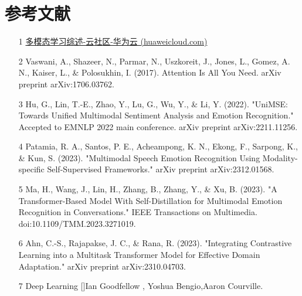 \documentclass[11pt]{article}
\begin{document}
    \section{参考文献}
    \begin{enumerate}
        \item [1]\href{https://bbs.huaweicloud.com/blogs/264134?utm_source=zhihu&utm_medium=bbs-ex&utm_campaign=ei&utm_content=content}{多模态学习综述-云社区-华为云 (huaweicloud.com)}
        \item [2]Vaswani, A., Shazeer, N., Parmar, N., Uszkoreit, J., Jones, L., Gomez, A. N., Kaiser, L., \& Polosukhin, I. (2017). Attention Is All You Need. arXiv preprint arXiv:1706.03762.
        \item [3]    Hu, G., Lin, T.-E., Zhao, Y., Lu, G., Wu, Y., \& Li, Y. (2022). "UniMSE: Towards Unified Multimodal Sentiment Analysis and Emotion Recognition." Accepted to EMNLP 2022 main conference. arXiv preprint arXiv:2211.11256.

        \item [4]Patamia, R. A., Santos, P. E., Acheampong, K. N., Ekong, F., Sarpong, K., \& Kun, S. (2023). "Multimodal Speech Emotion Recognition Using Modality-specific Self-Supervised Frameworks." arXiv preprint arXiv:2312.01568.

        \item [5]Ma, H., Wang, J., Lin, H., Zhang, B., Zhang, Y., \& Xu, B. (2023). "A Transformer-Based Model With Self-Distillation for Multimodal Emotion Recognition in Conversations." IEEE Transactions on Multimedia. doi:10.1109/TMM.2023.3271019.

        \item [6]Ahn, C.-S., Rajapakse, J. C., \& Rana, R. (2023). "Integrating Contrastive Learning into a Multitask Transformer Model for Effective Domain Adaptation." arXiv preprint arXiv:2310.04703.

        \item [7]Deep Learning []Ian Goodfellow , Yoshua Bengio,Aaron Courville.

    \end{enumerate}
    





   
    
    
    
\end{document}
